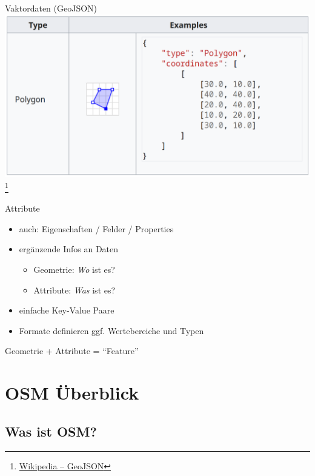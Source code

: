 \documentclass{beamer}
\begin{document}
		\begin{frame}{Vaktordaten (GeoJSON)}
			\includegraphics[width=\textwidth]{images/geodata-vector-2.png}\footnote{\href{https://en.wikipedia.org/wiki/GeoJSON}{Wikipedia -- GeoJSON}}
		\end{frame}
		
		\begin{frame}{Attribute}
			\begin{itemize}
				\item auch: Eigenschaften / Felder / Properties
				\item ergänzende Infos an Daten
				\begin{itemize}
					\item Geometrie: \textit{Wo} ist es?
					\item Attribute: \textit{Was} ist es?
				\end{itemize}\pause
				\item einfache Key-Value Paare\pause
				\item Formate definieren ggf. Wertebereiche und Typen
			\end{itemize}
			\pause
			\vspace{0.25cm}
			\begin{center}
				Geometrie + Attribute = \enquote{Feature}
			\end{center}
		\end{frame}
		
	\section{OSM Überblick}
	
		\begin{frame}
			\tableofcontents[currentsection]
		\end{frame}

		\subsection{Was ist OSM?}
	
\end{document}

